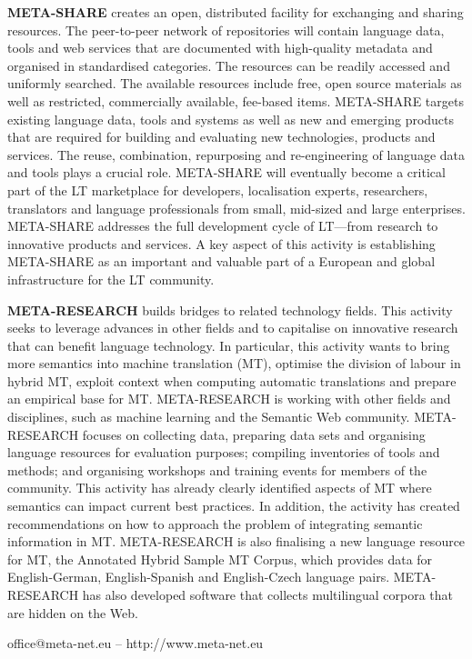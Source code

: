 \documentclass{../../metanetpaper}
\begin{document}
\begin{multicols}{2}
\textbf{META-SHARE} creates an open, distributed facility for exchanging and sharing resources. The peer-to-peer network of repositories will contain language data, tools and web services that are documented with high-quality metadata and organised in standardised categories. The resources can be readily accessed and uniformly searched. The available resources include free, open source materials as well as restricted, commercially available, fee-based items. META-SHARE targets existing language data, tools and systems as well as new and emerging products that are required for building and evaluating new technologies, products and services. The reuse, combination, repurposing and re-engineering of language data and tools plays a crucial role. META-SHARE will eventually become a critical part of the LT marketplace for developers, localisation experts, researchers, translators and language professionals from small, mid-sized and large enterprises. META-SHARE addresses the full development cycle of LT—from research to innovative products and services. A key aspect of this activity is establishing META-SHARE as an important and valuable part of a European and global infrastructure for the LT community. 

\textbf{META-RESEARCH} builds bridges to related technology fields. This activity seeks to leverage advances in other fields and to capitalise on innovative research that can benefit language technology. In particular, this activity wants to bring more semantics into machine translation (MT), optimise the division of labour in hybrid MT, exploit context when computing automatic translations and prepare an empirical base for MT. META-RESEARCH is working with other fields and disciplines, such as machine learning and the Semantic Web community. META-RESEARCH focuses on collecting data, preparing data sets and organising language resources for evaluation purposes; compiling inventories of tools and methods; and organising workshops and training events for members of the community. This activity has already clearly identified aspects of MT where semantics can impact current best practices. In addition, the activity has created recommendations on how to approach the problem of integrating semantic information in MT. META-RESEARCH is also finalising a new language resource for MT, the Annotated Hybrid Sample MT Corpus, which provides data for English-German, English-Spanish and English-Czech language pairs. META-RESEARCH has also developed software that collects multilingual corpora that are hidden on the Web.
\end{multicols}
\vfill
\centerline{office@meta-net.eu -- http://www.meta-net.eu}
\end{document}
